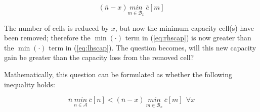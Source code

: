 \documentclass[10pt,twocolumn]{IEEEtran}
\begin{document}
\begin{equation}
\label{eq:rhscap}
(\overline{n}-x) \underset{m\in \mathcal{B}_x}{min} \ \overline c[m]
\end{equation}

The number of cells is reduced by $x$, but now the minimum capacity cell(s) have been removed; therefore the $\min(\cdot)$ term in (\ref{eq:rhscap}) is now greater than the $\min(\cdot)$ term in (\ref{eq:lhscap}).
 The question   becomes, will this new capacity gain be greater than the capacity loss from the removed cell?

Mathematically, this question can be formulated as whether the following inequality holds:

\begin{equation}
\overline{n} \  \underset{n\in \mathcal{A}}{min} \ \overline c[n] < (\overline{n}-x) \ \underset{m\in \mathcal{B}_x}{min} \ \overline c[m] \ \  \forall x
\label{eq:removecellineq}
\end{equation}
\end{document}
